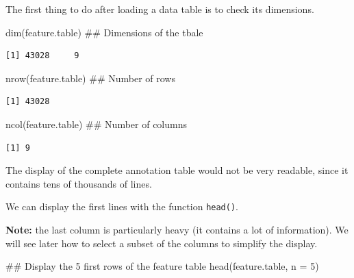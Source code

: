 \documentclass[]{article}
\newenvironment{Shaded}{\begin{snugshade}}{\end{snugshade}}
\newcommand{\KeywordTok}[1]{\textcolor[rgb]{0.94,0.87,0.69}{#1}}
\newcommand{\DataTypeTok}[1]{\textcolor[rgb]{0.87,0.87,0.75}{#1}}
\newcommand{\DecValTok}[1]{\textcolor[rgb]{0.86,0.86,0.80}{#1}}
\newcommand{\NormalTok}[1]{\textcolor[rgb]{0.80,0.80,0.80}{#1}}
\begin{document}
The first thing to do after loading a data table is to check its
dimensions.

\begin{Shaded}
\begin{Highlighting}[]
\KeywordTok{dim}\NormalTok{(feature.table) ## Dimensions of the tbale}
\end{Highlighting}
\end{Shaded}

\begin{verbatim}
[1] 43028     9
\end{verbatim}

\begin{Shaded}
\begin{Highlighting}[]
\KeywordTok{nrow}\NormalTok{(feature.table) ## Number of rows}
\end{Highlighting}
\end{Shaded}

\begin{verbatim}
[1] 43028
\end{verbatim}

\begin{Shaded}
\begin{Highlighting}[]
\KeywordTok{ncol}\NormalTok{(feature.table) ## Number of columns}
\end{Highlighting}
\end{Shaded}

\begin{verbatim}
[1] 9
\end{verbatim}

The display of the complete annotation table would not be very readable,
since it contains tens of thousands of lines.

We can display the first lines with the function \texttt{head()}.

\textbf{Note: } the last column is particularly heavy (it contains a lot
of information). We will see later how to select a subset of the columns
to simplify the display.

\begin{Shaded}
\begin{Highlighting}[]
\NormalTok{## Display the 5 first rows of the feature table}
\KeywordTok{head}\NormalTok{(feature.table, }\DataTypeTok{n =} \DecValTok{5}\NormalTok{) }
\end{Highlighting}
\end{Shaded}
\end{document}
